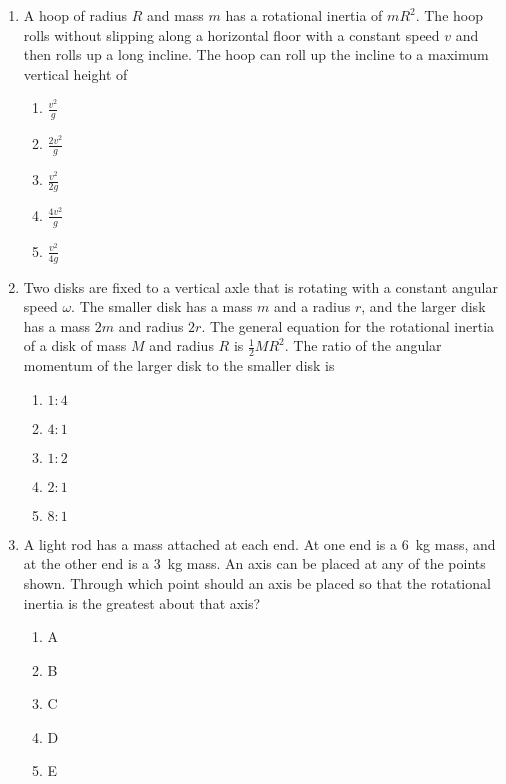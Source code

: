 \documentclass{../../../oss-apphys}
\begin{document}
\begin{multicols}{2}
\begin{enumerate}[leftmargin=18pt]
  \item A hoop of radius $R$ and mass $m$ has a rotational inertia of $mR^2$.
    The hoop rolls without slipping along a horizontal floor with a constant
    speed $v$ and then rolls up a long incline. The hoop can roll up the
    incline to a maximum vertical height of
    \begin{center}
    \end{center}
    \begin{enumerate}[nosep,leftmargin=18pt,label=(\Alph*)]
    \item$\displaystyle\frac{v^2}{g}$
    \item$\displaystyle\frac{2v^2}{g}$
    \item$\displaystyle\frac{v^2}{2g}$
    \item$\displaystyle\frac{4v^2}{g}$
    \item$\displaystyle\frac{v^2}{4g}$
    \end{enumerate}
    \columnbreak
    
  \item Two disks are fixed to a vertical axle that is rotating with a constant
    angular speed $\omega$. The smaller disk has a mass $m$ and a radius $r$,
    and the larger disk has a mass $2m$ and radius $2r$. The general equation
    for the rotational inertia of a disk of mass $M$ and radius $R$ is
    $\frac12MR^2$. The ratio of the angular momentum of the larger disk to
    the smaller disk is
    \begin{center}
    \end{center}
    \begin{enumerate}[nosep,leftmargin=18pt,label=(\Alph*)]
    \item$1:4$
    \item$4:1$
    \item$1:2$
    \item$2:1$
    \item$8:1$
    \end{enumerate}
    
  \item A light rod has a mass attached at each end. At one end is a
    \SI{6}{\kilo\gram} mass, and at the other end is a \SI{3}{\kilo\gram} mass.
    An axis can be placed at any of the points shown. Through which point
    should an axis be placed so that the rotational inertia is the greatest
    about that axis?
    \begin{center}
    \end{center}
    \begin{enumerate}[nosep,leftmargin=18pt,label=(\Alph*)]
    \item A
    \item B
    \item C
    \item D
    \item E
    \end{enumerate}
    

\end{enumerate}
\end{multicols}
\end{document}
